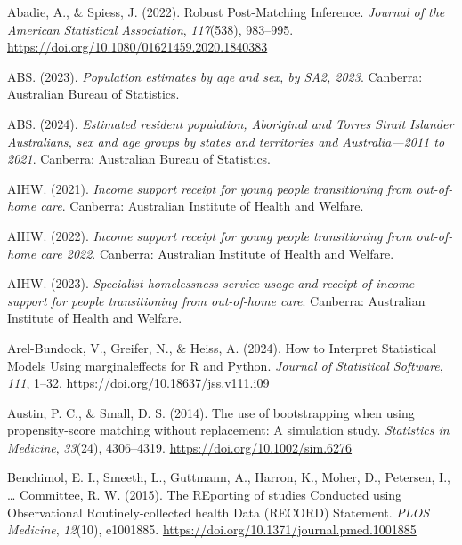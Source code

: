 \documentclass[
  jou,
  floatsintext,
  longtable,
  nolmodern,
  notxfonts,
  notimes,
  colorlinks=true,linkcolor=blue,citecolor=blue,urlcolor=blue]{apa7}
\newlength{\cslhangindent}
\newenvironment{CSLReferences}[2] %
 {\begin{list}{}{%
  \setlength{\itemindent}{0pt}
  \setlength{\leftmargin}{0pt}
  \setlength{\parsep}{0pt}
  \ifodd #1
   \setlength{\leftmargin}{\cslhangindent}
   \setlength{\itemindent}{-1\cslhangindent}
  \fi
  \setlength{\itemsep}{#2\baselineskip}}}
 {\end{list}}
\begin{document}
\label{refs}
\begin{CSLReferences}{1}{0}
Abadie, A., \& Spiess, J. (2022). Robust {Post-Matching Inference}.
\emph{Journal of the American Statistical Association}, \emph{117}(538),
983--995. \url{https://doi.org/10.1080/01621459.2020.1840383}

ABS. (2023). \emph{Population estimates by age and sex, by {SA2}, 2023}.
Canberra: Australian Bureau of Statistics.

ABS. (2024). \emph{Estimated resident population, {Aboriginal} and
{Torres Strait Islander Australians}, sex and age groups by states and
territories and {Australia}---2011 to 2021}. Canberra: Australian Bureau
of Statistics.

AIHW. (2021). \emph{Income support receipt for young people
transitioning from out-of-home care}. Canberra: {Australian Institute of
Health and Welfare}.

AIHW. (2022). \emph{Income support receipt for young people
transitioning from out-of-home care 2022}. Canberra: {Australian
Institute of Health and Welfare}.

AIHW. (2023). \emph{Specialist homelessness service usage and receipt of
income support for people transitioning from out-of-home care}.
Canberra: {Australian Institute of Health and Welfare}.

Arel-Bundock, V., Greifer, N., \& Heiss, A. (2024). How to {Interpret
Statistical Models Using} marginaleffects for {R} and {Python}.
\emph{Journal of Statistical Software}, \emph{111}, 1--32.
\url{https://doi.org/10.18637/jss.v111.i09}

Austin, P. C., \& Small, D. S. (2014). The use of bootstrapping when
using propensity-score matching without replacement: A simulation study.
\emph{Statistics in Medicine}, \emph{33}(24), 4306--4319.
\url{https://doi.org/10.1002/sim.6276}

Benchimol, E. I., Smeeth, L., Guttmann, A., Harron, K., Moher, D.,
Petersen, I., \ldots{} Committee, R. W. (2015). The {REporting} of
studies {Conducted} using {Observational Routinely-collected} health
{Data} ({RECORD}) {Statement}. \emph{PLOS Medicine}, \emph{12}(10),
e1001885. \url{https://doi.org/10.1371/journal.pmed.1001885}


\end{CSLReferences}
\end{document}
